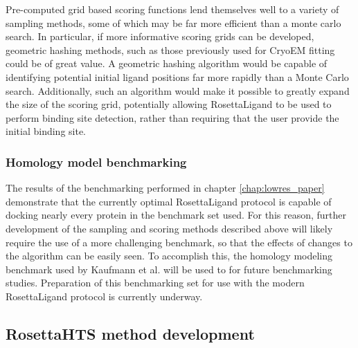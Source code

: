 Pre-computed grid based scoring functions lend themselves well to a variety of sampling methods, some of which may be far more efficient than a monte carlo search.
In particular, if more informative scoring grids can be developed, geometric hashing methods, such as those previously used for CryoEM fitting \citep{Woetzel:2011id} could be of great value.
A geometric hashing algorithm would be capable of identifying potential initial ligand positions far more rapidly than a Monte Carlo search.
Additionally, such an algorithm would make it possible to greatly expand the size of the scoring grid, potentially allowing RosettaLigand to be used to perform binding site detection, rather than requiring that the user provide the initial binding site. 

\subsubsection{Homology model benchmarking}

The results of the benchmarking performed in chapter \ref{chap:lowres_paper} demonstrate that the currently optimal RosettaLigand protocol is capable of docking nearly every protein in the benchmark set used.
For this reason, further development of the sampling and scoring methods described above will likely require the use of a more challenging benchmark, so that the effects of changes to the algorithm can be easily seen. 
To accomplish this, the homology modeling benchmark used by Kaufmann et al. \citep{Kaufmann:2012ck} will be used to for future benchmarking studies.
Preparation of this benchmarking set for use with the modern RosettaLigand protocol is currently underway.

\subsection{RosettaHTS method development}
\label{subsec:hts_further_development}
